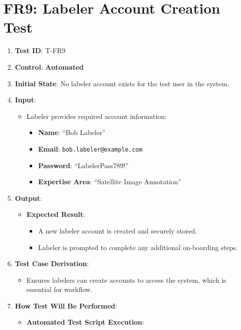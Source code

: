 \documentclass[12pt, titlepage]{article}
\begin{document}
\section*{FR9: Labeler Account Creation Test}

\begin{enumerate}
    \item \textbf{Test ID}: T-FR9
    \item \textbf{Control}: \textbf{Automated}
    \item \textbf{Initial State}: No labeler account exists for the test user in the system.
    \item \textbf{Input}:
    \begin{itemize}
        \item Labeler provides required account information:
        \begin{itemize}
            \item \textbf{Name}: ``Bob Labeler''
            \item \textbf{Email}: \texttt{bob.labeler@example.com}
            \item \textbf{Password}: ``LabelerPass789!''
            \item \textbf{Expertise Area}: ``Satellite Image Annotation''
        \end{itemize}
    \end{itemize}
    \item \textbf{Output}:
    \begin{itemize}
        \item \textbf{Expected Result}:
        \begin{itemize}
            \item A new labeler account is created and securely stored.
            \item Labeler is prompted to complete any additional on-boarding steps.
        \end{itemize}
    \end{itemize}
    \item \textbf{Test Case Derivation}:
    \begin{itemize}
        \item Ensures labelers can create accounts to access the system, which is essential for workflow.
    \end{itemize}
    \item \textbf{How Test Will Be Performed}:
    \begin{itemize}
        \item \textbf{Automated Test Script Execution}:

\end{itemize}
\end{enumerate}
\end{document}
